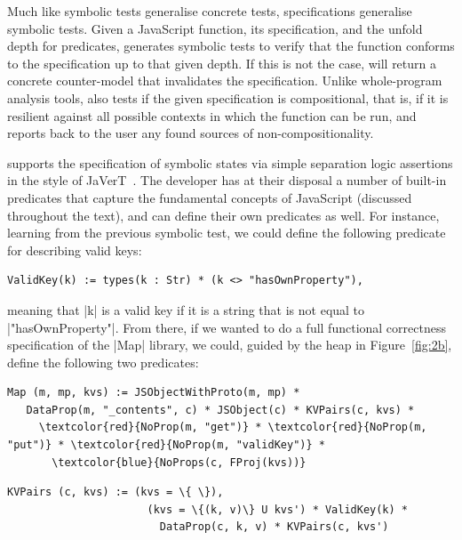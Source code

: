 Much like symbolic tests generalise concrete tests, specifications generalise symbolic tests. Given a JavaScript function, its specification, and the unfold depth for predicates, \cosette generates symbolic tests to verify that the function conforms to the specification up to that given depth. If this is not the case, \cosette will return a concrete counter-model that invalidates the specification. Unlike whole-program analysis tools, \cosette also tests if the given specification is compositional, that is, if it is resilient against all possible contexts in which the function can be run, and reports back to the user any found sources of non-compositionality.

\cosette supports the specification of symbolic states via simple separation logic assertions in the style of JaVerT~\cite{javert}. The developer has at their disposal a number of built-in predicates that capture the fundamental concepts of JavaScript (discussed throughout the text), and can define their own predicates as well. For instance, learning from the previous symbolic test, we could define the following predicate for describing valid keys:
\begin{Verbatim}[fontsize=\footnotesize,commandchars=\\\{\}]
    ValidKey(k) := types(k : Str) * (k <> "hasOwnProperty"),
\end{Verbatim}
\noindent meaning that \jsinline|k| is a valid key if it is a string that is not equal to \jsinline|"hasOwnProperty"|. From there, if we wanted to do a full functional correctness specification of the \jsinline|Map| library, we could, guided by the heap in Figure~\ref{fig:2b}, define the following two predicates:


\smallskip
\begin{Verbatim}[fontsize=\footnotesize,commandchars=\\\{\}]
 Map (m, mp, kvs) := JSObjectWithProto(m, mp) * 
   DataProp(m, "_contents", c) * JSObject(c) * KVPairs(c, kvs) * 
     \textcolor{red}{NoProp(m, "get")} * \textcolor{red}{NoProp(m, "put")} * \textcolor{red}{NoProp(m, "validKey")} * 
       \textcolor{blue}{NoProps(c, FProj(kvs))}
\end{Verbatim}
\begin{Verbatim}[fontsize=\footnotesize,commandchars=\\\{\}]
  KVPairs (c, kvs) := (kvs = \{ \}),
                      (kvs = \{(k, v)\} U kvs') * ValidKey(k) * 
                        DataProp(c, k, v) * KVPairs(c, kvs')
\end{Verbatim}

